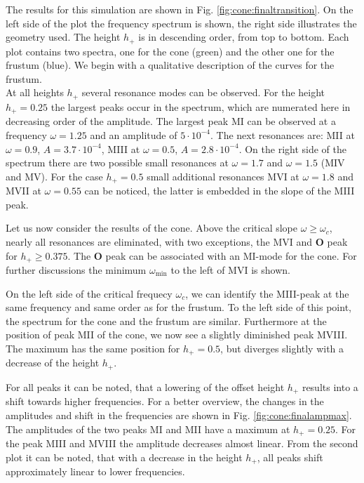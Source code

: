 The results for this simulation are shown in Fig. \ref{fig:cone:finaltransition}.
On the left side of the plot  the frequency spectrum is shown, the right side illustrates the geometry used.
The height $h_+$ is in descending order, from top to bottom.
Each plot contains two spectra, one for the cone (green)  and the other one for the frustum (blue).
We begin with a qualitative description of the curves for the frustum.\\
At all heights $h_+$ several resonance modes can be observed. For the height ${h_+=0.25}$
the largest peaks occur in the spectrum, which are numerated here in decreasing order of the amplitude.
The largest peak M\RN{1} can be observed at a frequency $\omega=1.25$ and an amplitude of $5\cdot10^{-4}$.
The next resonances are: M\RN{2} at $\omega=0.9$, $A=3.7\cdot10^{-4}$, M\RN{3} at $\omega=0.5$,  $A=2.8\cdot10^{-4}$.
On the right side of the spectrum there are two possible small resonances at $\omega=1.7$ and $\omega=1.5$ (M\RN{4} and M\RN{5}).
For the case $h_+=0.5$  small additional resonances  M\RN{6} at $\omega=1.8$ and M\RN{7} at $\omega=0.55$ can be noticed,
the latter is embedded in the slope of the M\RN{3} peak.

Let us now consider the results of the cone.
Above the critical slope $\omega\geq\omega_c$, nearly all resonances are eliminated,
with two exceptions, the M\RN{6} and \textbf{O} peak for $h_+\geq0.375$.
The \textbf{O} peak can be associated with an M\RN{1}-mode for the cone.
For further discussions the minimum $\omega_{\text{min}}$ to the left of M\RN{6} is shown.

On the left side of the critical frequecy $\omega_c$, we can identify the M\RN{3}-peak
at the same frequency and same order as for the frustum. To the left side of this point, the spectrum for
the cone and the frustum are similar.
Furthermore at the position of peak M\RN{2} of the cone, we now see a slightly diminished peak M\RN{8}.
The maximum has the same position for $h_+=0.5$, but diverges slightly with a decrease of the height $h_+$.

For all peaks  it can be noted, that a lowering of the offset height $h_+$ results
into a shift towards higher frequencies. %
For a better overview, the changes in the amplitudes and shift in the frequencies are shown in
Fig. \ref{fig:cone:finalampmax}. %
The amplitudes of the two peaks M\RN{1} and M\RN{2} have a maximum at $h_+= 0.25$. For the peak M\RN{3} and M\RN{8} the amplitude decreases almost linear.
From the second plot it can be noted, that with a decrease in the height $h_+$,
all peaks shift approximately linear to lower frequencies.

